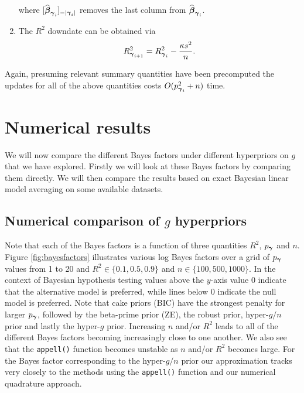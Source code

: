 \begin{enumerate}
	\noindent where $[ \widehat{{\boldsymbol \beta}}_{{\boldsymbol \gamma}_{i}}]_{-|{{\boldsymbol \gamma}_{i}}|}$
	removes the last column from $\widehat{{\boldsymbol \beta}}_{{\boldsymbol \gamma}_{i}}$.
	
	\item 
	The $R^2$ downdate can be obtained
	via
	$$
	R_{{\boldsymbol \gamma}_{i+1}}^2 = R_{{\boldsymbol \gamma}_{i}}^2 - \frac{\kappa s^2}{n}.
	$$
	
	
\end{enumerate}

\noindent Again, presuming relevant summary quantities have been precomputed
the updates for all of the above quantities costs $O(p_{{\boldsymbol \gamma}_{i}}^2 + n)$ time.





\section{Numerical results}
\label{sec:numerical_g_prior}

We will now compare the different Bayes factors under different hyperpriors on $g$ that we have explored. 
Firstly we will look at these Bayes factors by comparing them directly.
We will then compare the results based on exact Bayesian linear model
averaging on some available datasets.


\subsection{Numerical comparison of $g$ hyperpriors}

Note that
each of the Bayes factors is a function of three quantities $R^2$, $p_{\boldsymbol \gamma}$ 
and $n$. Figure \ref{fig:bayesfactors} illustrates various log Bayes factors
over a grid of $p_{\boldsymbol \gamma}$ values from 1 to 20 and $R^2\in\{0.1,0.5,0.9\}$
and $n \in \{100,500,1000\}$. In the context of Bayesian hypothesis testing
values above the $y$-axis value 0 indicate that the alternative model is
preferred, while lines below 0 indicate the null model is preferred. Note that
cake priors (BIC) have the strongest penalty for larger $p_{\boldsymbol \gamma}$, followed
by the beta-prime prior (ZE), the robust prior, hyper-$g/n$ prior and lastly
the hyper-$g$ prior. Increasing $n$ and/or $R^2$ leads to all of the different
Bayes factors becoming increasingly close to one another. We also see that 
the {\tt appell()} function becomes unstable as $n$ and/or $R^2$ becomes large.
For the Bayes factor corresponding to the hyper-$g/n$ prior our approximation
tracks very closely to the methods using the {\tt appell()} function and our
numerical quadrature approach.


